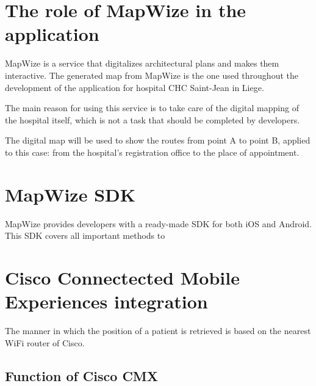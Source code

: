 \section{The role of MapWize in the application}
MapWize is a service that digitalizes architectural plans and makes them interactive.
The generated map from MapWize is the one used throughout the development of the application
for hospital CHC Saint-Jean in Liege.

The main reason for using this service is to take care of the digital mapping of the hospital itself,
which is not a task that should be completed by developers.

The digital map will be used to show the routes from point A to point B, applied to this case:
from the hospital's registration office to the place of appointment.

\section{MapWize SDK}
MapWize provides developers with a ready-made SDK for both iOS and Android. This SDK covers
all important methods to 

\section{Cisco Connectected Mobile Experiences integration}
The manner in which the position of a patient is retrieved is based on the nearest WiFi router of Cisco.\cite{cscmu}
\subsection{Function of Cisco CMX}



